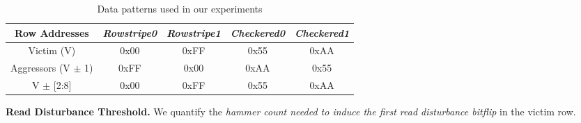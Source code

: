 \begin{table}[!htbp]
\caption{Data patterns used in our experiments}
\vspace{-1em}
\begin{center}
\begin{adjustbox}{max width=\linewidth}
\begin{tabular}{|c||c|c|c|c|}
\hline
\textbf{Row Addresses} & \textbf{\textit{Rowstripe0}}&
\textbf{\textit{Rowstripe1}}& \textbf{\textit{Checkered0}} &
\textbf{\textit{Checkered1}}\\
\hline
\hline
Victim (V) & 0x00 & 0xFF & 0x55 & 0xAA\\
\hline
Aggressors (V $\pm$ 1) & 0xFF & 0x00 & 0xAA & 0x55\\
\hline
V $\pm$ [2:8] & 0x00 & 0xFF & 0x55 & 0xAA\\
\hline
\end{tabular}
\end{adjustbox}
\label{table_data_patterns}
\end{center}
\vspace{-1em}
\end{table}



\noindent
\textbf{Read Disturbance Threshold.} 
We quantify 
\emph{} 
the \emph{hammer count needed to induce the first read disturbance bitflip} in
the victim row.
